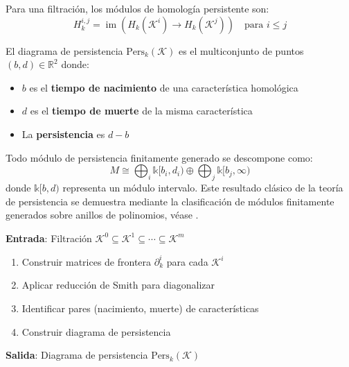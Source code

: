 \begin{definition}\label{def:modulos_homologia_persistente}
Para una filtración, los módulos de homología persistente son:
\begin{equation}
    H_k^{i,j} = \operatorname{im}(H_k(\mathcal{K}^i) \to H_k(\mathcal{K}^j)) \quad \text{para } i \leq j
\end{equation}
\end{definition}

\begin{definition}\label{def:diagrama_persistencia}
El diagrama de persistencia $\text{Pers}_k(\mathcal{K})$ es el multiconjunto de puntos $(b,d) \in \mathbb{R}^2$ donde:
\begin{itemize}
    \item $b$ es el \textbf{tiempo de nacimiento} de una característica homológica
    \item $d$ es el \textbf{tiempo de muerte} de la misma característica
    \item La \textbf{persistencia} es $d - b$
\end{itemize}
\end{definition}

\begin{theorem}\label{thm:descomposicion_modulos}
Todo módulo de persistencia finitamente generado se descompone como:
\begin{equation}
    M \cong \bigoplus_i \mathbb{k}[b_i, d_i) \oplus \bigoplus_j \mathbb{k}[b_j, \infty)
\end{equation}
donde $\mathbb{k}[b,d)$ representa un módulo intervalo. Este resultado clásico de la teoría de persistencia se demuestra mediante la clasificación de módulos finitamente generados sobre anillos de polinomios, véase \citep{Hatcher2002}.
\end{theorem}

\begin{algorithm}[H]
\caption{Algoritmo de Homología Persistente}\label{alg:homologia_persistente}
\textbf{Entrada}: Filtración $\mathcal{K}^0 \subseteq \mathcal{K}^1 \subseteq \cdots \subseteq \mathcal{K}^m$
\begin{enumerate}
    \item Construir matrices de frontera $\partial_k^i$ para cada $\mathcal{K}^i$
    \item Aplicar reducción de Smith para diagonalizar
    \item Identificar pares (nacimiento, muerte) de características
    \item Construir diagrama de persistencia
\end{enumerate}
\textbf{Salida}: Diagrama de persistencia $\text{Pers}_k(\mathcal{K})$
\end{algorithm}

